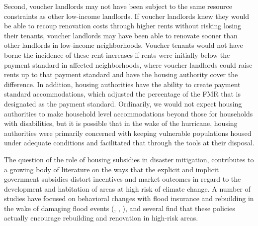 \documentclass[12pt]{article}
\begin{document}
{{{{{Second, voucher landlords may not have been subject to the same resource constraints as other low-income landlords. If voucher landlords knew they would be able to recoup renovation costs through higher rents without risking losing their tenants, voucher landlords may have been able to renovate sooner than other landlords in low-income neighborhoods.  Voucher tenants would not have borne the incidence of these rent increases if rents were initially below the payment standard in affected neighborhoods, where voucher landlords could raise rents up to that payment standard and have the housing authority cover the difference.  In addition, housing authorities have the ability to create payment standard accommodations, which adjusted the percentage of the FMR that is designated as the payment standard.   Ordinarily, we would not expect housing authorities to make household level accommodations beyond those for households with disabilities, but it is possible that in the wake of the hurricane, housing authorities were primarily concerned with keeping vulnerable populations housed under adequate conditions and facilitated that through the tools at their disposal.  


The question of the role of housing subsidies in disaster mitigation, contributes to a growing body of literature on the ways that the explicit and implicit government subsidies distort incentives and market outcomes in regard to the development and habitation of areas at high risk of climate change. A number of studies have focused on behavioral changes with flood insurance and rebuilding in the wake of damaging flood events (\cite{kousky_learning_2010}, \cite{gregory_impact_2017}, \cite{gallagher_learning_2014}), and several find that these policies actually encourage rebuilding and renovation in high-risk areas.  

}}}}}
\end{document}
